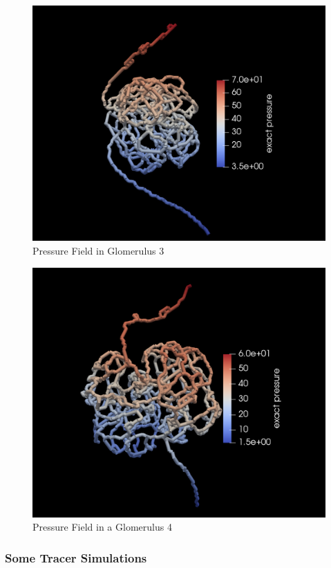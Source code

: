 \begin{figure}[h]
\centering
\includegraphics[width=162mm]{glom3_pressure}
\caption{Pressure Field in Glomerulus 3}
\label{fig:glom3_pressure}
\end{figure}
\begin{figure}[h]
\centering
\includegraphics[width=162mm]{glom4_pressure}
\caption{Pressure Field in a Glomerulus 4}
\label{fig:glom4_pressure}
\end{figure}


\subsubsection*{Some Tracer Simulations}
\label{Tracer}

